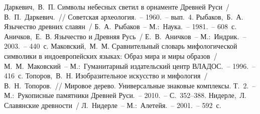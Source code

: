 \documentclass[pscyr,titlepage,chapters]{hedreport}
\begin{document}
  \renewcommand{\bibname}{Список литературы}
  \begin{thebibliography}{9}
     Даркевич,~В.~П. Символы небесных светил в орнаменте Древней
      Руси~/ В.~П.~Даркевич.~// Советская археология.~-- 1960.~-- вып.~4.
     Рыбаков,~Б.~А. Язычество древних славян~/ Б.~А.~Рыбаков~--
      М.:~Наука.~-- 1981.~-- 608~с.
     Аничков,~Е.~В. Язычество и Древняя Русь~/ Е.~В.~Аничков~--
      М.:~Индрик.~-- 2003.~-- 440~с.
     Маковский,~М.~М. Сравнительный словарь мифологической символики
      в индоевропейских языках: Образ мира и миры образов~/ М.~М.~Маковский~--
      М.:~Гуманитарный издательский центр ВЛАДОС.~-- 1996.~-- 416~с.
     Топоров,~В.~Н. Изобразительное искусство и мифология~/
      В.~Н.~Топоров.~// Мировое дерево. Универсальные знаковые комплексы.
      Т.~2.~-- М.:~Рукописные памятники Древней Руси.~-- 2010.~-- С.~352--388.
     Нидерле,~Л. Славянские древности~/ Л.~Нидерле~--
      М.:~Алетейя.~-- 2001.~-- 592~с.
\end{thebibliography}
\end{document}
